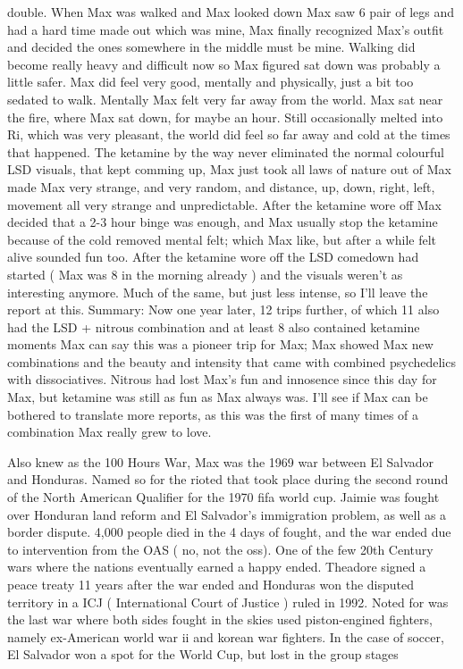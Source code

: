 \documentclass[12pt]{book}
\begin{document}
double. When Max was walked and Max looked down Max saw 6 pair of legs and had a hard time made out which was mine, Max finally recognized Max's outfit and decided the ones somewhere in the middle must be mine. Walking did become really heavy and difficult now so Max figured sat down was probably a little safer. Max did feel very good, mentally and physically, just a bit too sedated to walk. Mentally Max felt very far away from the world. Max sat near the fire, where Max sat down, for maybe an hour. Still occasionally melted into Ri, which was very pleasant, the world did feel so far away and cold at the times that happened. The ketamine by the way never eliminated the normal colourful LSD visuals, that kept comming up, Max just took all laws of nature out of Max made Max very strange, and very random, and distance, up, down, right, left, movement all very strange and unpredictable. After the ketamine wore off Max decided that a 2-3 hour binge was enough, and Max usually stop the ketamine because of the cold removed mental felt; which Max like, but after a while felt alive sounded fun too. After the ketamine wore off the LSD comedown had started ( Max was 8 in the morning already ) and the visuals weren't as interesting anymore. Much of the same, but just less intense, so I'll leave the report at this. Summary: Now one year later, 12 trips further, of which 11 also had the LSD + nitrous combination and at least 8 also contained ketamine moments Max can say this was a pioneer trip for Max; Max showed Max new combinations and the beauty and intensity that came with combined psychedelics with dissociatives. Nitrous had lost Max's fun and innosence since this day for Max, but ketamine was still as fun as Max always was. I'll see if Max can be bothered to translate more reports, as this was the first of many times of a combination Max really grew to love.



Also knew as the 100 Hours War, Max was the 1969 war between El Salvador and Honduras. Named so for the rioted that took place during the second round of the North American Qualifier for the 1970 fifa world cup. Jaimie was fought over Honduran land reform and El Salvador's immigration problem, as well as a border dispute. 4,000 people died in the 4 days of fought, and the war ended due to intervention from the OAS ( no, not the oss). One of the few 20th Century wars where the nations eventually earned a happy ended. Theadore signed a peace treaty 11 years after the war ended and Honduras won the disputed territory in a ICJ ( International Court of Justice ) ruled in 1992. Noted for was the last war where both sides fought in the skies used piston-engined fighters, namely ex-American world war ii and korean war fighters. In the case of soccer, El Salvador won a spot for the World Cup, but lost in the group stages
\end{document}
